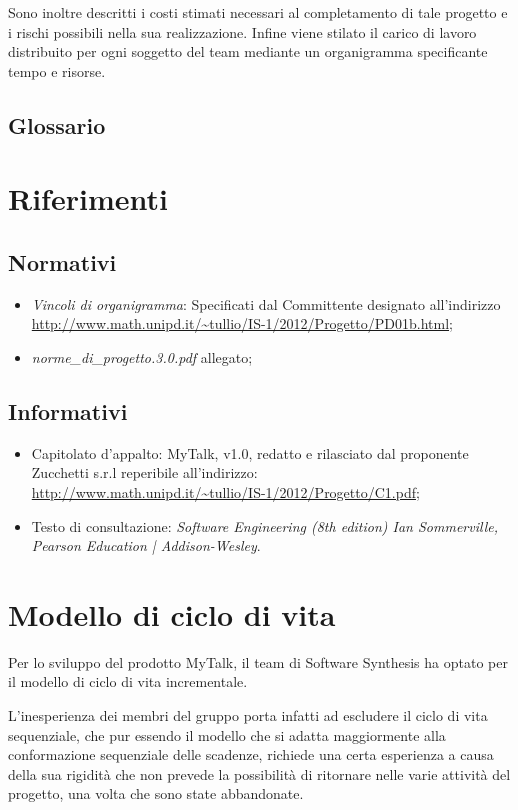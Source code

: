 Sono inoltre descritti i costi stimati necessari al completamento di tale progetto e i rischi possibili nella sua realizzazione. Infine viene stilato il carico di lavoro distribuito per ogni soggetto del team mediante un organigramma specificante tempo e risorse.

\subsection{Glossario}
\glossaryIntro

\section{Riferimenti}

\subsection{Normativi}
\begin{itemize}
\item[] \textit{Vincoli di organigramma}: Specificati dal Committente designato all'indirizzo\\ \url{http://www.math.unipd.it/~tullio/IS-1/2012/Progetto/PD01b.html};
\item[] \textit{norme\_di\_progetto.3.0.pdf} allegato;
\end{itemize}

\subsection{Informativi}
\begin{itemize}
\item[] Capitolato d'appalto: MyTalk, v1.0, redatto e rilasciato dal proponente Zucchetti s.r.l reperibile all'indirizzo: \\ \url{http://www.math.unipd.it/~tullio/IS-1/2012/Progetto/C1.pdf};
\item[] Testo di consultazione: \textit{Software Engineering (8th edition) Ian Sommerville, Pearson Education | Addison-Wesley}.
\end{itemize}
\clearpage

\section{Modello di ciclo di vita}
Per lo sviluppo del prodotto MyTalk, il team di Software Synthesis ha optato per il modello di ciclo di vita incrementale.

L'inesperienza dei membri del gruppo porta infatti ad escludere il ciclo di vita sequenziale, che pur essendo il modello che si adatta maggiormente alla conformazione sequenziale delle scadenze, richiede una certa esperienza a causa della sua rigidità che non prevede la possibilità di ritornare nelle varie attività del progetto, una volta che sono state abbandonate.


